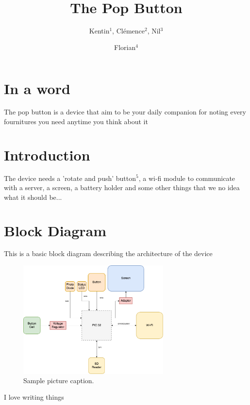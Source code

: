 \documentclass[letterpaper]{article}
\title{The Pop Button}
\author{Kentin$^{1}$, Cl\'emence$^{2}$, Nil$^{3}$ \and Florian$^4$}
\begin{document}
\maketitle

\section{In a word}

The pop button is a device that aim to be your daily companion for noting every fournitures you need anytime you think about it


\section{Introduction}

The device needs a 'rotate and push' button$^5$, a wi-fi module to communicate with a server, a screen, a battery holder and some other things that we no idea what it should be... 

\section{Block Diagram}

This is a basic block diagram describing the architecture of the device
\begin{figure}[!htb]
\begin{center}
\includegraphics[width=3in]{test_img_block_diagram.png}
\caption{Sample picture caption.}
\label{fig1}
\end{center}
\end{figure}

I love writing things

\begin{table}[!hbt]
\vskip 0.25cm
\caption{Sample table caption.}
\end{table}
\end{document}
